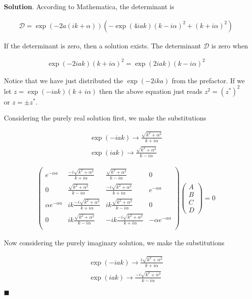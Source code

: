 \documentclass[12pt]{article}
\theoremstyle{definition}
\newenvironment{s}{%
        \begin{trivlist} \item \textbf{Solution}. }{%
            \hspace*{\fill} $\blacksquare$\end{trivlist}}%
\begin{document}
{\begin{s}
According to Mathematica, the determinant is 

\begin{align*}
\mathcal{D} = \exp(-2a(ik+\alpha))\left(-\exp(4iak)(k-i\alpha)^{2} + (k+i\alpha)^{2}\right)
\end{align*}

If the determinant is zero, then a solution exists. The determinant $\mathcal{D}$ is zero when

\begin{align*}
\exp(-2iak)(k+i\alpha)^{2} = \exp(2iak)(k-i\alpha)^{2}
\end{align*}

Notice that we have just distributed the $\exp(-2ika)$ from the prefactor. If we let $z = \exp(-iak)(k+i\alpha)$ then the above equation just reads $z^{2} = (z^{*})^{2}$ or $z = \pm z^{*}$. 

Considering the purely real solution first, we make the substitutions

\begin{align*}
\exp(-iak) \rightarrow \frac{\sqrt{k^{2} + \alpha^{2}}}{k+i\alpha}\\
\exp(iak) \rightarrow \frac{\sqrt{k^{2} + \alpha^{2}}}{k-i\alpha}
\end{align*}


\begin{align*}
\begin{pmatrix}
e^{-\alpha a} & \frac{-i\sqrt{k^{2} + \alpha^{2}}}{k+i\alpha} & \frac{\sqrt{k^{2} + \alpha^{2}}}{k-i\alpha} & 0\\
0 & \frac{\sqrt{k^{2} + \alpha^{2}}}{k-i\alpha} & \frac{-i\sqrt{k^{2} + \alpha^{2}}}{k+i\alpha} & e^{-\alpha a}\\
\alpha e^{-\alpha a} & ik\frac{-i\sqrt{k^{2} + \alpha^{2}}}{k+i\alpha} & ik\frac{\sqrt{k^{2} + \alpha^{2}}}{k-i\alpha} & 0\\
0 & ik\frac{\sqrt{k^{2} + \alpha^{2}}}{k-i\alpha} & -ik\frac{-i\sqrt{k^{2} + \alpha^{2}}}{k+i\alpha} & -\alpha e^{-\alpha a}\\
\end{pmatrix}\begin{pmatrix}A\\B\\C\\D\end{pmatrix} = 0
\end{align*}

Now considering the purely imaginary solution, we make the substitutions

\begin{align*}
\exp(-iak) \rightarrow \frac{i\sqrt{k^{2} + \alpha^{2}}}{k+i\alpha}\\
\exp(iak) \rightarrow \frac{-i\sqrt{k^{2} + \alpha^{2}}}{k-i\alpha}
\end{align*}


\end{s}}
\end{document}
